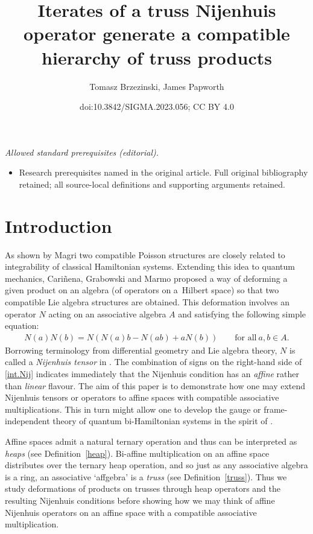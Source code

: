 \documentclass[10pt,a4paper]{amsart}
\title{Iterates of a truss Nijenhuis operator generate a compatible hierarchy of truss products}
\author{Tomasz Brzezinski, James Papworth}
\date{doi:10.3842/SIGMA.2023.056; CC BY 4.0}
\numberwithin{equation}{section}
\begin{document}
\maketitle
\noindent\textit{Allowed standard prerequisites (editorial).}\begin{itemize}
\item Research prerequisites named in the original article. Full original bibliography retained; all source-local definitions and supporting arguments retained.
\end{itemize}\medskip
\section{Introduction}

As shown by Magri \cite{Mag:sim} two compatible Poisson structures are closely related to integrability of classical Hamiltonian systems. Extending this idea to quantum mechanics, Cari\~nena, Grabowski and Marmo \cite{4} proposed a way of deforming a given product on an algebra (of operators on a~Hilbert space) so that two compatible Lie algebra structures are obtained. This deformation involves an operator $N$ acting on an associative algebra $A$ and satisfying the following simple equation:
\begin{gather}\label{int.Nij}
 N(a)N(b) = N(N(a)b-N(ab)+aN(b)) \qquad \mbox{for all}\ a,b\in A.
\end{gather}
Borrowing terminology from differential geometry and Lie algebra theory, $N$ is called a {\em Nijenhuis tensor} in \cite{4}. The combination of signs on the right-hand side of \eqref{int.Nij} indicates immediately that the Nijenhuis condition has an {\em affine} rather than {\em linear} flavour. The aim of this paper is to demonstrate how one may extend Nijenhuis tensors or operators to affine spaces with compatible associative multiplications. This in turn might allow one to develop the gauge or frame-independent theory of quantum bi-Hamiltonian systems in the spirit of \cite{Ben:fib, MasVig:non, Tul:fra, Urb:aff, Wei:uni}.

Affine spaces admit a natural ternary operation and thus can be interpreted as \textit{heaps} (see Definition~\ref{heap}). Bi-affine multiplication on an affine space distributes over the ternary heap operation, and so just as any associative algebra is a ring, an associative `affgebra' is a \textit{truss} (see Definition~\ref{truss}). Thus we study deformations of products on trusses through heap operators and the resulting Nijenhuis conditions before showing how we may think of affine Nijenhuis operators on an affine space with a compatible associative multiplication.
\end{document}
